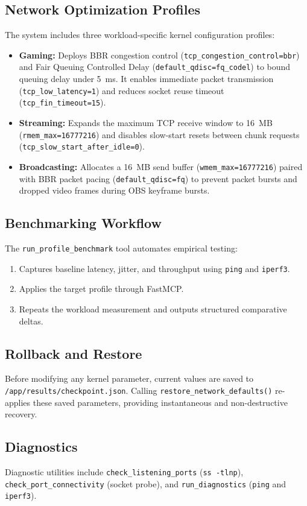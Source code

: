 \documentclass[11pt,a4paper]{article}
\begin{document}
\subsection{Network Optimization Profiles}
The system includes three workload-specific kernel configuration profiles:
\begin{itemize}
    \item \textbf{Gaming:} Deploys BBR congestion control (\texttt{tcp\_congestion\_control=bbr}) and Fair Queuing Controlled Delay (\texttt{default\_qdisc=fq\_codel}) to bound queuing delay under 5~ms. It enables immediate packet transmission (\texttt{tcp\_low\_latency=1}) and reduces socket reuse timeout (\texttt{tcp\_fin\_timeout=15}).
    \item \textbf{Streaming:} Expands the maximum TCP receive window to 16~MB (\texttt{rmem\_max=16777216}) and disables slow-start resets between chunk requests (\texttt{tcp\_slow\_start\_after\_idle=0}).
    \item \textbf{Broadcasting:} Allocates a 16~MB send buffer (\texttt{wmem\_max=16777216}) paired with BBR packet pacing (\texttt{default\_qdisc=fq}) to prevent packet bursts and dropped video frames during OBS keyframe bursts.
\end{itemize}

\subsection{Benchmarking Workflow}
The \texttt{run\_profile\_benchmark} tool automates empirical testing:
\begin{enumerate}
    \item Captures baseline latency, jitter, and throughput using \texttt{ping} and \texttt{iperf3}.
    \item Applies the target profile through FastMCP.
    \item Repeats the workload measurement and outputs structured comparative deltas.
\end{enumerate}

\subsection{Rollback and Restore}
Before modifying any kernel parameter, current values are saved to \texttt{/app/results/checkpoint.json}. Calling \texttt{restore\_network\_defaults()} re-applies these saved parameters, providing instantaneous and non-destructive recovery.

\subsection{Diagnostics}
Diagnostic utilities include \texttt{check\_listening\_ports} (\texttt{ss -tlnp}), \texttt{check\_port\_connectivity} (socket probe), and \texttt{run\_diagnostics} (\texttt{ping} and \texttt{iperf3}).
\end{document}
